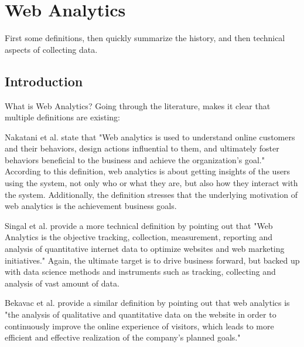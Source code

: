 





\section{Web Analytics}

First some definitions, then quickly summarize the history, and then technical aspects of collecting data.


\subsection{Introduction}

What is Web Analytics?
Going through the literature, makes it clear that multiple definitions are existing:

Nakatani et al. state that "Web analytics is used to understand online customers and their behaviors, design actions influential to them, and ultimately foster behaviors beneficial to the business and achieve the organization's goal." %
According to this definition, web analytics is about getting insights of the users using the system, not only who or what they are, but also how they interact with the system.
Additionally, the definition stresses that the underlying motivation of web analytics is the achievement business goals.

Singal et al. provide a more technical definition by pointing out that "Web Analytics is the objective tracking, collection, measurement, reporting and analysis of quantitative internet data to optimize websites and web marketing initiatives." %
Again, the ultimate target is to drive business forward, but backed up with data science methods and instruments such as tracking, collecting and analysis of vast amount of data.

Bekavac et al. provide a similar definition by pointing out that web analytics is "the analysis of qualitative and quantitative data on the website in order to continuously improve the online experience of visitors, which leads to more efficient and effective realization of the company's planned goals." %

